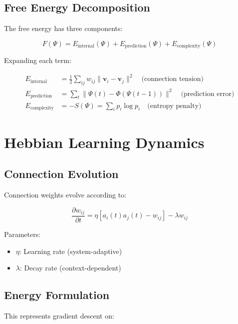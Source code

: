 \documentclass[12pt,a4paper,openany]{book} %
\begin{document}
\subsection{Free Energy Decomposition}

The free energy has three components:

\begin{equation}
F(\Psi) = E_{\text{internal}}(\Psi) + E_{\text{prediction}}(\Psi) + E_{\text{complexity}}(\Psi)
\end{equation}

Expanding each term:

\begin{align}
E_{\text{internal}} &= \frac{1}{2} \sum_{ij} w_{ij} \|\mathbf{v}_i - \mathbf{v}_j\|^2 \quad \text{(connection tension)}\\
E_{\text{prediction}} &= \sum_t \|\Psi(t) - \Phi(\Psi(t-1))\|^2 \quad \text{(prediction error)}\\
E_{\text{complexity}} &= -S(\Psi) = \sum_i p_i \log p_i \quad \text{(entropy penalty)}
\end{align}

\section{Hebbian Learning Dynamics}

\subsection{Connection Evolution}

Connection weights evolve according to:

\begin{equation}
\frac{\partial w_{ij}}{\partial t} = \eta[a_i(t)a_j(t) - w_{ij}] - \lambda w_{ij}
\end{equation}

Parameters:
\begin{itemize}
    \item $\eta$: Learning rate (system-adaptive)
    \item $\lambda$: Decay rate (context-dependent)
\end{itemize}

\subsection{Energy Formulation}

This represents gradient descent on:
\end{document}
